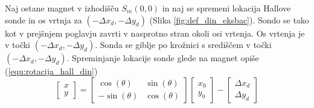 %
Naj ostane magnet v izhodišču $S_m(0,0)$ in naj se spremeni lokacija Hallove sonde in os vrtnja za $(-\Delta x_d,-\Delta y_d)$ (Slika \ref{fig:def_din_eksbac}). Sondo se tako kot v prejšnjem poglavju zavrti v nasprotno stran okoli osi vrtenja. Os vrtenja je v točki $(-\Delta x_d,-\Delta y_d)$. Sonda se giblje po krožnici s središčem v točki $(-\Delta x_d,-\Delta y_d)$. Spreminjanje lokacije sonde glede na magnet opiše (\ref{equ:rotacija_hall_din})
\begin{equation}
\label{equ:rotacija_hall_din}
\begin{bmatrix} x\\y \end{bmatrix}=
\begin{bmatrix} \cos(\theta)&\sin(\theta)\\-\sin(\theta)&\cos(\theta) \end{bmatrix}
\begin{bmatrix} x_0\\y_0 \end{bmatrix}
-
\begin{bmatrix} \Delta x_d\\\Delta y_d \end{bmatrix}
\end{equation}

